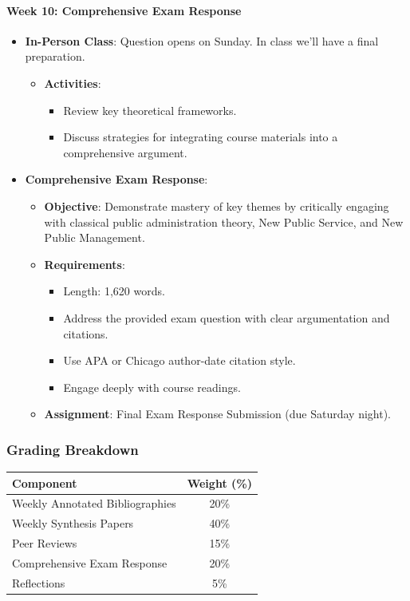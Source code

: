 \documentclass[12pt, letterpaper]{article}
\begin{document}
\paragraph{Week 10: Comprehensive Exam Response}
\begin{itemize}
    \item \textbf{In-Person Class}: Question opens on Sunday. In class we'll have a final preparation.
    \begin{itemize}
        \item \textbf{Activities}:
        \begin{itemize}
            \item Review key theoretical frameworks.
            \item Discuss strategies for integrating course materials into a comprehensive argument.
        \end{itemize}
    \end{itemize}
    \item \textbf{Comprehensive Exam Response}:
    \begin{itemize}
        \item \textbf{Objective}: Demonstrate mastery of key themes by critically engaging with classical public administration theory, New Public Service, and New Public Management.
        \item \textbf{Requirements}:
        \begin{itemize}
            \item Length: 1,620 words.
            \item Address the provided exam question with clear argumentation and citations.
            \item Use APA or Chicago author-date citation style.
            \item Engage deeply with course readings.
        \end{itemize}
        \item \textbf{Assignment}: Final Exam Response Submission (due Saturday night).
    \end{itemize}
\end{itemize}

\subsubsection*{Grading Breakdown}
\begin{table}[h!]
\centering
\begin{tabular}{|l|c|}
\hline
\textbf{Component} & \textbf{Weight (\%)} \\
\hline
Weekly Annotated Bibliographies & 20\% \\
Weekly Synthesis Papers & 40\% \\
Peer Reviews & 15\% \\
Comprehensive Exam Response & 20\% \\
Reflections & 5\% \\
\hline
\end{tabular}
\end{table}
\end{document}
